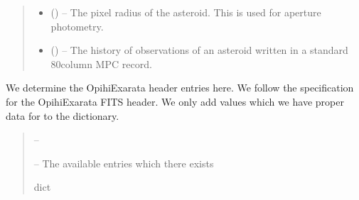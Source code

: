 \documentclass[letterpaper,11pt,english]{sphinxmanual}
\begin{document}
\begin{savenotes}
\begin{fulllineitems}
\begin{savenotes}
\begin{fulllineitems}
\begin{quote}
\begin{description}
\begin{itemize}
\item {} 
\sphinxAtStartPar
{} () – The pixel radius of the asteroid. This is used for aperture photometry.

\item {} 
\sphinxAtStartPar
{} (\sphinxstyleliteralemphasis{\sphinxupquote{, }}) – The history of observations of an asteroid written in a standard
80\sphinxhyphen{}column MPC record.

\end{itemize}

\end{description}\end{quote}

\end{fulllineitems}\end{savenotes}


\begin{savenotes}\begin{fulllineitems}
\label{\detokenize{code/opihiexarata.opihi.solution:opihiexarata.opihi.solution.OpihiSolution._generate_opihiexarata_fits_entries_dictionary}}
\pysigstartsignatures
{}
\pysigstopsignatures
\sphinxAtStartPar
We determine the OpihiExarata header entries here. We follow the
specification for the OpihiExarata FITS header. We only add values
which we have proper data for to the dictionary.
\begin{quote}\begin{description}
\sphinxAtStartPar
{} – 

\sphinxAtStartPar
{} – The available entries which there exists

\sphinxAtStartPar
dict

\end{description}\end{quote}


\end{fulllineitems}
\end{savenotes}
\end{fulllineitems}
\end{savenotes}
\end{document}
